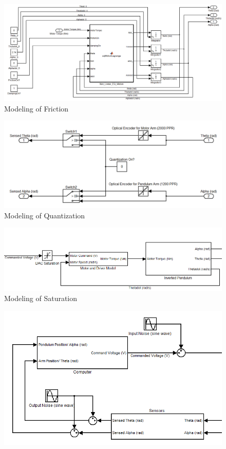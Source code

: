 \documentclass{article}
\theoremstyle{plain}
\theoremstyle{definition}
\theoremstyle{remark}
\begin{document}
\begin{itemize}
\begin{figure}[h!]
\includegraphics[width=1\textwidth]{q10_1.png}
\caption{Modeling of Friction} \label{tex}
\label{fig:q10_1}
\end{figure}
\begin{figure}[h!]
\includegraphics[width=1\textwidth]{q10_3.png}
\caption{Modeling of Quantization} \label{tex}
\label{fig:q10_3}
\end{figure}
\begin{figure}[h!]
\includegraphics[width=1\textwidth]{q10_5.png}
\caption{Modeling of Saturation} \label{tex}
\label{fig:q10_5}
\end{figure}
\begin{figure}[h!]
\includegraphics[width=1\textwidth]{q10_6.png}

\end{figure}
\end{itemize}
\end{document}
